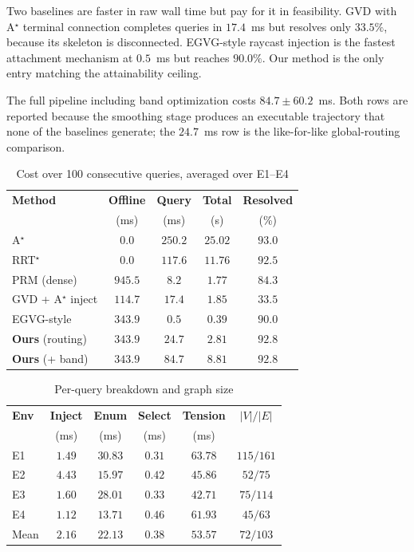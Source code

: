 \documentclass[conference]{IEEEtran}
\begin{document}
Two baselines are faster in raw wall time but pay for it in feasibility. GVD with A$^\star$ terminal connection completes queries in $17.4$~ms but resolves only $33.5\%$, because its skeleton is disconnected. EGVG-style raycast injection is the fastest attachment mechanism at $0.5$~ms but reaches $90.0\%$. Our method is the only entry matching the attainability ceiling.

The full pipeline including band optimization costs $84.7\pm60.2$~ms. Both rows are reported because the smoothing stage produces an executable trajectory that none of the baselines generate; the $24.7$~ms row is the like-for-like global-routing comparison.

\begin{table}[htbp]
\caption{Cost over 100 consecutive queries, averaged over E1--E4}
\label{tab:compute_benchmarks}
\begin{center}
\begin{tabular}{@{}lcccc@{}}
\toprule
\textbf{Method} & \textbf{Offline} & \textbf{Query} & \textbf{Total} & \textbf{Resolved} \\
& (ms) & (ms) & (s) & (\%) \\ \midrule
A$^\star$ & $0.0$ & $250.2$ & $25.02$ & $93.0$ \\
RRT$^\star$ & $0.0$ & $117.6$ & $11.76$ & $92.5$ \\
PRM (dense) & $945.5$ & $8.2$ & $1.77$ & $84.3$ \\
GVD + A$^\star$ inject & $114.7$ & $17.4$ & $1.85$ & $33.5$ \\
EGVG-style~\cite{qi2025egvg} & $343.9$ & $0.5$ & $0.39$ & $90.0$ \\ \midrule
\textbf{Ours} (routing) & $\mathbf{343.9}$ & $\mathbf{24.7}$ & $\mathbf{2.81}$ & $\mathbf{92.8}$ \\
\textbf{Ours} (+ band) & $343.9$ & $84.7$ & $8.81$ & $92.8$ \\ \bottomrule
\end{tabular}
\end{center}
\end{table}

\begin{table}[htbp]
\caption{Per-query breakdown and graph size}
\label{tab:breakdown}
\begin{center}
\begin{tabular}{@{}lccccc@{}}
\toprule
\textbf{Env} & \textbf{Inject} & \textbf{Enum} & \textbf{Select} & \textbf{Tension} & \textbf{$|V|/|E|$} \\
& (ms) & (ms) & (ms) & (ms) & \\ \midrule
E1 & $1.49$ & $30.83$ & $0.31$ & $63.78$ & $115/161$ \\
E2 & $4.43$ & $15.97$ & $0.42$ & $45.86$ & $52/75$ \\
E3 & $1.60$ & $28.01$ & $0.33$ & $42.71$ & $75/114$ \\
E4 & $1.12$ & $13.71$ & $0.46$ & $61.93$ & $45/63$ \\ \midrule
Mean & $2.16$ & $22.13$ & $0.38$ & $53.57$ & $72/103$ \\ \bottomrule
\end{tabular}
\end{center}
\end{table}
\end{document}
